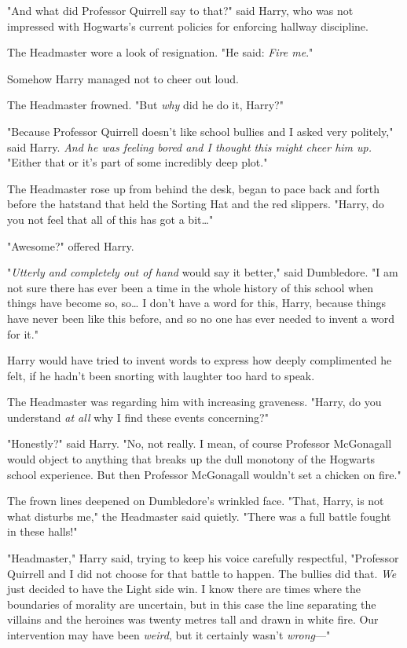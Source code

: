 "And what did Professor Quirrell say to that?" said Harry, who was not
impressed with Hogwarts's current policies for enforcing hallway discipline.

The Headmaster wore a look of resignation. "He said: \emph{Fire me}."

Somehow Harry managed not to cheer out loud.

The Headmaster frowned. "But \emph{why} did he do it, Harry?"

"Because Professor Quirrell doesn't like school bullies and I asked very
politely," said Harry. \emph{And he was feeling bored and I thought this might
cheer him up.} "Either that or it's part of some incredibly deep plot."

The Headmaster rose up from behind the desk, began to pace back and forth
before the hatstand that held the Sorting Hat and the red slippers. "Harry, do
you not feel that all of this has got a bit{\ldots}"

"Awesome?" offered Harry.

"\emph{Utterly and completely out of hand} would say it better," said
Dumbledore. "I am not sure there has ever been a time in the whole history of
this school when things have become so, so{\ldots} I don't have a word for
this, Harry, because things have never been like this before, and so no one
has ever needed to invent a word for it."

Harry would have tried to invent words to express how deeply complimented he
felt, if he hadn't been snorting with laughter too hard to speak.

The Headmaster was regarding him with increasing graveness. "Harry, do you
understand \emph{at all} why I find these events concerning?"

"Honestly?" said Harry. "No, not really. I mean, of course Professor McGonagall
would object to anything that breaks up the dull monotony of the Hogwarts
school experience. But then Professor McGonagall wouldn't set a chicken on
fire."

The frown lines deepened on Dumbledore's wrinkled face. "That, Harry, is not
what disturbs me," the Headmaster said quietly. "There was a full battle fought
in these halls!"

"Headmaster," Harry said, trying to keep his voice carefully respectful,
"Professor Quirrell and I did not choose for that battle to happen. The bullies
did that. \emph{We} just decided to have the Light side win. I know there are
times where the boundaries of morality are uncertain, but in this case the line
separating the villains and the heroines was twenty metres tall and drawn in
white fire. Our intervention may have been \emph{weird}, but it certainly
wasn't \emph{wrong}---"

